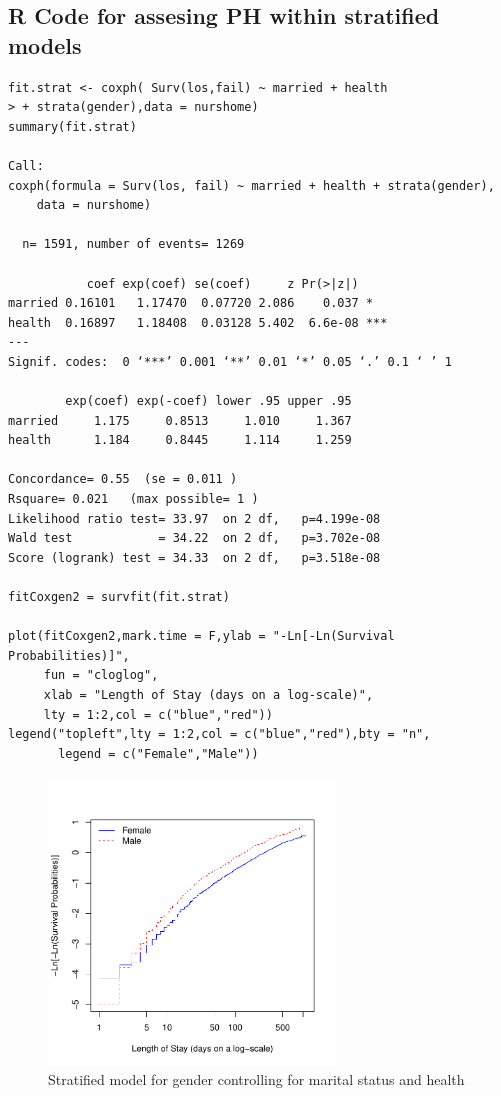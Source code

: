 \documentclass[11pt,psfig]{book}
\begin{document}
\subsection{R Code for assesing PH within stratified models}
\small
\begin{verbatim}
fit.strat <- coxph( Surv(los,fail) ~ married + health 
> + strata(gender),data = nurshome)
summary(fit.strat)

Call:
coxph(formula = Surv(los, fail) ~ married + health + strata(gender),
    data = nurshome)

  n= 1591, number of events= 1269

           coef exp(coef) se(coef)     z Pr(>|z|)
married 0.16101   1.17470  0.07720 2.086    0.037 *
health  0.16897   1.18408  0.03128 5.402  6.6e-08 ***
---
Signif. codes:  0 ‘***’ 0.001 ‘**’ 0.01 ‘*’ 0.05 ‘.’ 0.1 ‘ ’ 1

        exp(coef) exp(-coef) lower .95 upper .95
married     1.175     0.8513     1.010     1.367
health      1.184     0.8445     1.114     1.259

Concordance= 0.55  (se = 0.011 )
Rsquare= 0.021   (max possible= 1 )
Likelihood ratio test= 33.97  on 2 df,   p=4.199e-08
Wald test            = 34.22  on 2 df,   p=3.702e-08
Score (logrank) test = 34.33  on 2 df,   p=3.518e-08

fitCoxgen2 = survfit(fit.strat)

plot(fitCoxgen2,mark.time = F,ylab = "-Ln[-Ln(Survival Probabilities)]",
     fun = "cloglog",
     xlab = "Length of Stay (days on a log-scale)",
     lty = 1:2,col = c("blue","red"))
legend("topleft",lty = 1:2,col = c("blue","red"),bty = "n",
       legend = c("Female","Male"))
\end{verbatim}

\begin{figure}[h!]
\caption{Stratified model for gender controlling for marital status and health}
\centerline{\includegraphics[width=3in]{ch12stratph.pdf}}
\end{figure}
\end{document}
